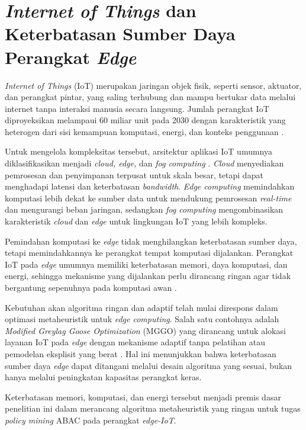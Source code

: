 \section{\textit{Internet of Things} dan Keterbatasan Sumber Daya Perangkat \textit{Edge}}

\textit{Internet of Things} (IoT) merupakan jaringan objek fisik, seperti sensor, aktuator, dan perangkat pintar, yang saling terhubung dan mampu bertukar data melalui internet tanpa interaksi manusia secara langsung.
Jumlah perangkat IoT diproyeksikan melampaui 60 miliar unit pada 2030 dengan karakteristik yang heterogen dari sisi kemampuan komputasi, energi, dan konteks penggunaan \parencite{ahsan_comprehensive_2025}.

Untuk mengelola kompleksitas tersebut, arsitektur aplikasi IoT umumnya diklasifikasikan menjadi \textit{cloud, edge,} dan \textit{fog computing} \parencite{dauda_survey_2024}.
\textit{Cloud} menyediakan pemrosesan dan penyimpanan terpusat untuk skala besar, tetapi dapat menghadapi latensi dan keterbatasan \textit{bandwidth}.
\textit{Edge computing} memindahkan komputasi lebih dekat ke sumber data untuk mendukung pemrosesan \textit{real-time} dan mengurangi beban jaringan, sedangkan \textit{fog computing} mengombinasikan karakteristik \textit{cloud} dan \textit{edge} untuk lingkungan IoT yang lebih kompleks.

Pemindahan komputasi ke \textit{edge} tidak menghilangkan keterbatasan sumber daya, tetapi memindahkannya ke perangkat tempat komputasi dijalankan.
Perangkat IoT pada \textit{edge} umumnya memiliki keterbatasan memori, daya komputasi, dan energi, sehingga mekanisme yang dijalankan perlu dirancang ringan agar tidak bergantung sepenuhnya pada komputasi awan \parencite{canavese_security_2024}.

Kebutuhan akan algoritma ringan dan adaptif telah mulai direspons dalam optimasi metaheuristik untuk \textit{edge computing}.
Salah satu contohnya adalah \textit{Modified Greylag Goose Optimization} (MGGO) yang dirancang untuk alokasi layanan IoT pada \textit{edge} dengan mekanisme adaptif tanpa pelatihan atau pemodelan eksplisit yang berat \parencite{khosrowshahi_refined_2025}.
Hal ini menunjukkan bahwa keterbatasan sumber daya \textit{edge} dapat ditangani melalui desain algoritma yang sesuai, bukan hanya melalui peningkatan kapasitas perangkat keras.

Keterbatasan memori, komputasi, dan energi tersebut menjadi premis dasar penelitian ini dalam merancang algoritma metaheuristik yang ringan untuk tugas \textit{policy mining} ABAC pada perangkat \textit{edge-IoT}.